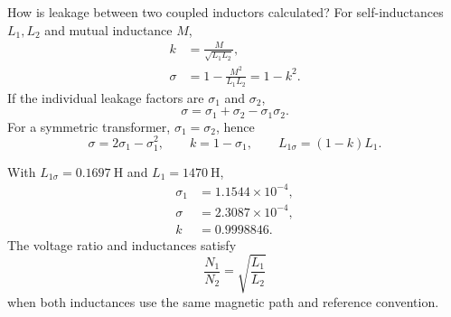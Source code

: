 \begin{formulaBox}{How is leakage between two coupled inductors calculated?}
For self-inductances $L_1,L_2$ and mutual inductance $M$,
\begin{align}
k&=\frac{M}{\sqrt{L_1L_2}},\\
\sigma&=1-\frac{M^2}{L_1L_2}=1-k^2.
\end{align}
If the individual leakage factors are $\sigma_1$ and $\sigma_2$,
\begin{equation}
\sigma=\sigma_1+\sigma_2-\sigma_1\sigma_2.
\end{equation}
For a symmetric transformer, $\sigma_1=\sigma_2$, hence
\begin{equation}
\sigma=2\sigma_1-\sigma_1^2,
\qquad k=1-\sigma_1,
\qquad L_{1\sigma}=(1-k)L_1.
\end{equation}

With $L_{1\sigma}=\SI{0.1697}{\henry}$ and
$L_1=\SI{1470}{\henry}$,
\begin{align}
\sigma_1&=1.1544\times10^{-4},\\
\sigma&=2.3087\times10^{-4},\\
k&=\boxed{0.9998846}.
\end{align}
The voltage ratio and inductances satisfy
\begin{equation}
\frac{N_1}{N_2}=\sqrt{\frac{L_1}{L_2}}
\end{equation}
when both inductances use the same magnetic path and reference convention.
\end{formulaBox}

